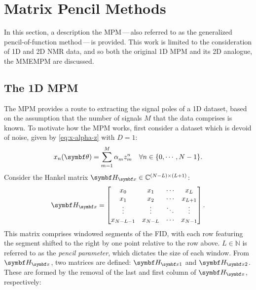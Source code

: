 \section{Matrix Pencil Methods}
\label{sec:mpm}
In this section, a description the \ac{MPM}\,---\,also referred to as the
generalized pencil-of-function method\cite{Hua1989}\,---\,is provided. This
work is limited to the consideration of \ac{1D} and \ac{2D} \ac{NMR} data, and
so both the original \ac{1D} \ac{MPM} and its \ac{2D} analogue, the \ac{MMEMPM}
are discussed.

\subsection{The 1D MPM}
\label{subsec:mpm}
The \ac{MPM} provides a route to extracting the signal poles of a \ac{1D}
dataset, based on the assumption that the number of signals $M$ that the data
comprises is known\cite{Hua1990,Hua1990b,Hua1991}.
To motivate how the \ac{MPM} works, first consider a dataset which is devoid of
noise, given by \cref{eq:x-alpha-z} with $D=1$:
\begin{equation}
    x_n(\bth) = \sumM \alpha_m^{\vphantom{n}} z_m^n
    \quad \forall n \in \lbrace 0, \cdots, N-1 \rbrace.
\end{equation}
Consider the Hankel matrix $\Hx \in \mathbb{C}^{(N-L) \times (L+1)}$:
\begin{equation}
    \Hx =
    \begin{bmatrix}
        x_0 & x_1 & \cdots & x_L\\
        x_1 & x_2 & \cdots & x_{L+1}\\
        \vdots & \vdots & \ddots & \vdots\\
        x_{N-L-1} & x_{N-L} & \cdots & x_{N-1}
    \end{bmatrix}.
\end{equation}
This matrix comprises windowed segments of the FID, with each row featuring
the segment shifted to the right by one point relative to the row above.
$L \in \mathbb{N}$ is referred to as the \emph{pencil parameter}, which
dictates the size of each window. From $\Hx$, two matrices are defined:
$\Hxone$ and $\Hxtwo$.  These are formed by the removal of the last and first
column of $\Hx$, respectively:
